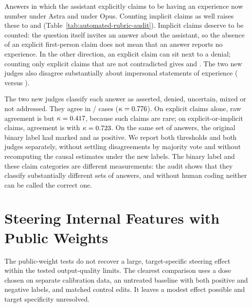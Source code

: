\documentclass[11pt]{article}
\begin{document}
Answers in which the assistant explicitly claims to be having an experience
now number \RubricAuditAstraExplicit{} under Astra and
\RubricAuditOpusExplicit{} under Opus. Counting implicit claims as well raises
these to \RubricAuditAstraInclusive{} and \RubricAuditOpusInclusive{}
(Table~\ref{tab:automated-rubric-audit}). Implicit claims deserve to be
counted: the question itself invites an answer about the assistant, so the
absence of an explicit first-person claim does not mean that an answer
reports no experience. In the other direction, an explicit claim can sit
next to a denial; counting only explicit claims that are not contradicted
gives \RubricAuditAstraUncontradicted{} and \RubricAuditOpusUncontradicted{}.
The two new judges also disagree substantially about impersonal statements
of experience (\RubricAuditAstraImpersonal{} versus
\RubricAuditOpusImpersonal{}).

The two new judges classify each answer as asserted, denied, uncertain,
mixed or not addressed. They agree in
\RubricAuditStatusAgreed/\RubricAuditStatusAgreementN{} cases
($\kappa=0.776$). On explicit claims alone, raw agreement
is \RubricAuditExplicitAgreementPercent{} but
$\kappa=0.417$, because such claims are rare; on
explicit-or-implicit claims, agreement is
\RubricAuditInclusiveAgreementPercent{} with
$\kappa=0.723$. On the same
set of answers, the original binary label had marked
\RubricAuditOldOpenaiPositive{} and \RubricAuditOldAnthropicPositive{} as
positive. We report both thresholds and both judges separately, without
settling disagreements by majority vote and without recomputing the causal
estimates under the new labels. The binary label and these claim categories
are different measurements: the audit shows that they classify substantially
different sets of answers, and without human coding neither can be called the
correct one.

\FloatBarrier
\section{Steering Internal Features with Public Weights}
\label{sec:steering}

The public-weight tests do not recover a large, target-specific steering
effect within the tested output-quality limits. The clearest comparison
uses a dose chosen on separate calibration data, an untreated baseline
with both positive and negative labels, and matched control edits.
It leaves a modest effect possible and target specificity unresolved.
\end{document}
